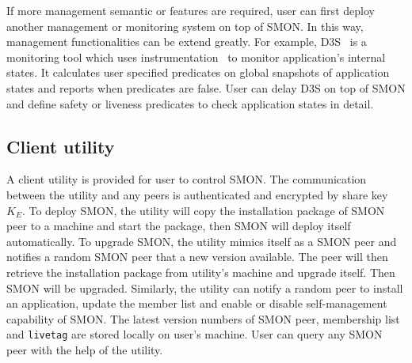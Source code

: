 
If more management semantic or features are required, user
can first deploy another management or monitoring system on
top of SMON. In this way, management functionalities can be
extend greatly. For example, D3S~\cite{Liu2008} is a
monitoring tool which uses instrumentation~\cite{Guo2008} to
monitor application's internal states. It calculates user
specified predicates on global snapshots of application
states and reports when predicates are false. User can delay
D3S on top of SMON and define safety or liveness predicates
to check application states in detail.


\subsection{Client utility}
\label{subsec:client}

A client utility is provided for user to control SMON. The
communication between the utility and any peers is
authenticated and encrypted by share key $K_E$. To deploy
SMON, the utility will copy the installation package of SMON
peer to a machine and start the package, then SMON will
deploy itself automatically. To upgrade SMON, the utility
mimics itself as a SMON peer and notifies a random SMON peer
that a new version available.  The peer will then retrieve
the installation package from utility's machine and upgrade
itself. Then SMON will be upgraded.  Similarly, the utility
can notify a random peer to install an application, update
the member list and enable or disable self-management
capability of SMON. The latest version numbers of SMON peer,
membership list and \texttt{livetag} are stored locally on
user's machine.  User can query any SMON peer with the help
of the utility.






